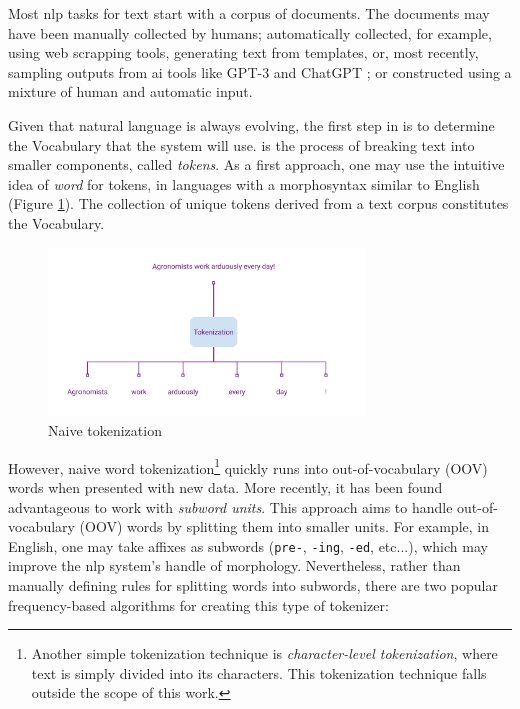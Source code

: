 \label{02_tokenization_and_embeddings}

Most \gls{nlp} tasks for text start with a corpus of documents. The documents may have been manually collected by humans; automatically collected, for example, using web scrapping tools, generating text from templates, or, most recently, sampling outputs from \gls{ai} tools like GPT-3  and ChatGPT ; or constructed using a mixture of human and automatic input.

Given that natural language is always evolving, the first step in \textclassification{} is to determine the Vocabulary that the system will use. \emph{\tokenization{}} is the process of breaking text into smaller components, called \emph{tokens}. As a first approach, one may use the intuitive idea of \emph{word} for tokens, in languages with a morphosyntax similar to English (Figure \ref{fig:naive_tokenization}). The collection of unique tokens derived from a text corpus constitutes the Vocabulary.

\begin{figure}
    \centering
    \includegraphics[width=0.75\textwidth]{Figures/02/01_Naive_Tokenization.png}
    \caption{Naive tokenization}
    \label{fig:naive_tokenization}
\end{figure}

However, naive word tokenization\footnote{Another simple tokenization technique is \emph{character-level tokenization}, where text is simply divided into its characters. This tokenization technique falls outside the scope of this work.} quickly runs into out-of-vocabulary (OOV) words when presented with new data. More recently, it has been found advantageous to work with \emph{subword units}. This approach aims to handle out-of-vocabulary (OOV) words by splitting them into smaller units. For example, in English, one may take affixes as subwords (\texttt{pre-}, \texttt{-ing}, \texttt{-ed}, etc...), which may improve the \gls{nlp} system's handle of morphology. Nevertheless, rather than manually defining rules for splitting words into subwords, there are two popular frequency-based algorithms for creating this type of tokenizer:

